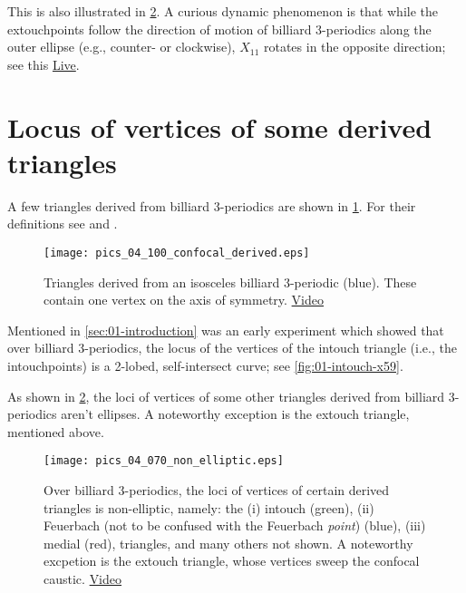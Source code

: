 This is also illustrated in \cref{fig:04-locus-x11-x100}. A curious dynamic phenomenon is that while the extouchpoints follow the direction of motion of billiard 3-periodics along the outer ellipse (e.g., counter- or clockwise), $X_{11}$ rotates in the opposite direction; see this \href{https://bit.ly/2S2LVqp}{Live}.



\section{Locus of vertices of some derived triangles}

A few triangles derived from billiard 3-periodics are shown in \cref{fig:04-derived-isosceles}. For their definitions see \cite{app:app-triangle} and \cite{mw}.

\begin{figure}
    \centering
    \texttt{[image: pics\_04\_100\_confocal\_derived.eps]}
    \caption{Triangles derived from an isosceles billiard 3-periodic (blue). These contain one vertex on the axis of symmetry. \href{https://youtu.be/xyroRTEVNDc}{Video}}
    \label{fig:04-derived-isosceles}
\end{figure}

Mentioned in \cref{sec:01-introduction} was an early experiment which showed that over billiard 3-periodics, the locus of the vertices of the intouch triangle (i.e., the intouchpoints) is a 2-lobed, self-intersect curve; see \cref{fig:01-intouch-x59}.

As shown in \cref{fig:04-locus-x11-x100}, the loci of vertices of some other triangles derived from billiard 3-periodics aren't ellipses. A noteworthy exception is the extouch triangle, mentioned above.

\begin{figure}
    \centering
    \texttt{[image: pics\_04\_070\_non\_elliptic.eps]}
    \caption{Over billiard 3-periodics, the loci of vertices of certain derived triangles is non-elliptic, namely: the (i) intouch (green), (ii) Feuerbach (not to be confused with the Feuerbach {\em point}) (blue), (iii) medial (red), triangles, and many others not shown. A noteworthy excpetion is the extouch triangle, whose vertices sweep the confocal caustic.
     \href{https://youtu.be/OGvCQbYqJyI}{Video}}
    \label{fig:04-locus-x11-x100}
\end{figure}

